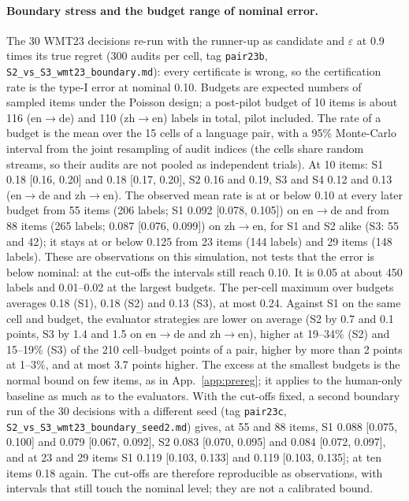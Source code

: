 \documentclass[11pt]{article}
\newcommand{\eps}{\varepsilon}
\begin{document}
\paragraph{Boundary stress and the budget range of nominal error.} The 30 WMT23 decisions re-run with the runner-up
as candidate and $\eps$ at 0.9 times its true regret (300 audits per cell, tag \texttt{pair23b},
\texttt{S2\_vs\_S3\_wmt23\_boundary.md}): every certificate is wrong, so the certification rate is the type-I error at
nominal 0.10. Budgets are expected numbers of sampled items under the Poisson design; a post-pilot budget of 10 items is
about 116 (en$\to$de) and 110 (zh$\to$en) labels in total, pilot included. The rate of a budget is the mean over the 15
cells of a language pair, with a 95\% Monte-Carlo interval from the joint resampling of audit indices (the cells share
random streams, so their audits are not pooled as independent trials). At 10 items: S1 0.18 [0.16, 0.20] and
0.18 [0.17, 0.20], S2 0.16 and 0.19, S3 and S4 0.12 and 0.13 (en$\to$de and zh$\to$en). The observed mean rate is at or
below 0.10 at every later budget from 55 items (206 labels; S1 0.092 [0.078, 0.105]) on en$\to$de and from 88 items
(265 labels; 0.087 [0.076, 0.099]) on zh$\to$en, for S1 and S2 alike (S3: 55 and 42); it stays at or below 0.125 from
23 items (144 labels) and 29 items (148 labels). These are observations on this simulation, not tests that the error is
below nominal: at the cut-offs the intervals still reach 0.10. It is 0.05 at about 450 labels and 0.01--0.02 at the
largest budgets. The per-cell maximum over budgets averages 0.18 (S1), 0.18 (S2) and 0.13 (S3), at most 0.24. Against
S1 on the same cell and budget, the evaluator strategies are lower on average (S2 by 0.7 and 0.1 points, S3 by 1.4 and
1.5 on en$\to$de and zh$\to$en), higher at 19--34\% (S2) and 15--19\% (S3) of the 210 cell--budget points of a pair,
higher by more than 2 points at 1--3\%, and at most 3.7 points higher. The excess at the smallest budgets is the normal
bound on few items, as in App.~\ref{app:prereg}; it applies to the human-only baseline as much as to the evaluators.
With the cut-offs fixed, a second boundary run of the 30 decisions with a different seed (tag \texttt{pair23c},
\texttt{S2\_vs\_S3\_wmt23\_boundary\_seed2.md}) gives, at 55 and 88 items, S1 0.088 [0.075, 0.100] and
0.079 [0.067, 0.092], S2 0.083 [0.070, 0.095] and 0.084 [0.072, 0.097], and at 23 and 29 items S1 0.119 [0.103, 0.133]
and 0.119 [0.103, 0.135]; at ten items 0.18 again. The cut-offs are therefore reproducible as observations, with
intervals that still touch the nominal level; they are not a calibrated bound.
\end{document}
